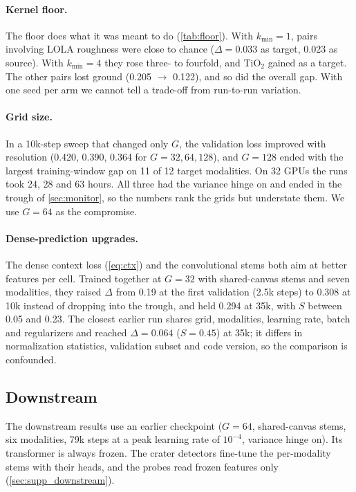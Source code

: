 \paragraph{Kernel floor.} The floor does what it was meant to do (\cref{tab:floor}). With $k_{\min}{=}1$, pairs involving LOLA roughness were close to chance ($\Delta{=}0.033$ as target, 0.023 as source). With $k_{\min}{=}4$ they rose three- to fourfold, and TiO$_2$ gained as a target. The other pairs lost ground (0.205 $\to$ 0.122), and so did the overall gap. With one seed per arm we cannot tell a trade-off from run-to-run variation.

\paragraph{Grid size.} In a 10k-step sweep that changed only $G$, the validation loss improved with resolution (0.420, 0.390, 0.364 for $G{=}32, 64, 128$), and $G{=}128$ ended with the largest training-window gap on 11 of 12 target modalities. On 32 GPUs the runs took 24, 28 and 63 hours. All three had the variance hinge on and ended in the trough of \cref{sec:monitor}, so the numbers rank the grids but understate them. We use $G{=}64$ as the compromise.

\paragraph{Dense-prediction upgrades.} The dense context loss (\cref{eq:ctx}) and the convolutional stems both aim at better features per cell. Trained together at $G{=}32$ with shared-canvas stems and seven modalities, they raised $\Delta$ from 0.19 at the first validation (2.5k steps) to 0.308 at 10k instead of dropping into the trough, and held 0.294 at 35k, with $S$ between 0.05 and 0.23. The closest earlier run shares grid, modalities, learning rate, batch and regularizers and reached $\Delta{=}0.064$ ($S{=}0.45$) at 35k; it differs in normalization statistics, validation subset and code version, so the comparison is confounded. 

\subsection{Downstream}
\label{sec:downstream}

The downstream results use an earlier checkpoint ($G{=}64$, shared-canvas stems, six modalities, 79k steps at a peak learning rate of $10^{-4}$, variance hinge on). Its transformer is always frozen. The crater detectors fine-tune the per-modality stems with their heads, and the probes read frozen features only (\cref{sec:supp_downstream}).

